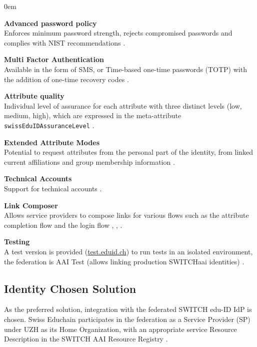 \begin{description}
	\itemsep0em
	\item\textbf{Advanced password policy} \hfill \\
	Enforces minimum password strength, rejects compromised passwords and complies with NIST recommendations \cite{eduid-password-policy}.
	\item\textbf{Multi Factor Authentication} \hfill \\
	Available in the form of SMS, or Time-based one-time passwords (TOTP) with the addition of one-time recovery codes \cite{eduid-two-step-login}.
	\item\textbf{Attribute quality} \hfill \\
	Individual level of assurance for each attribute with three distinct levels (low, medium, high), which are expressed in the meta-attribute \texttt{swissEduIDAssuranceLevel} \cite{eduid-attribute-quality}.
	\item\textbf{Extended Attribute Modes} \hfill \\
	Potential to request attributes from the personal part of the identity, from linked current affiliations and group membership information \cite{eduid-extended-attribute-model}.
	\item\textbf{Technical Accounts} \hfill \\ 
	Support for technical accounts \cite{eduid-technical-accounts}. 
	\item\textbf{Link Composer} \hfill \\
	Allows service providers to compose links for various flows such as the attribute completion flow and the login flow \cite{eduid-link-composer}, \cite{eduid-attribute-flow}, \cite{eduid-login-flow}. 
	\item\textbf{Testing} \hfill \\
	A test version is provided (\url{test.eduid.ch}) to run tests in an isolated environment, the federation is AAI Test (allows linking production SWITCHaai identities) \cite{eduid-testing}. 
\end{description}

\subsection{Identity Chosen Solution} \label{ssec:iam-solution}

As the preferred solution, integration with the federated SWITCH edu-ID IdP is chosen. Swiss Educhain participates in the federation as a Service Provider (SP) under UZH as its Home Organization, with an appropriate service Resource Description in the SWITCH AAI Resource Registry \cite{switch-aai-resource-registry-website}.

